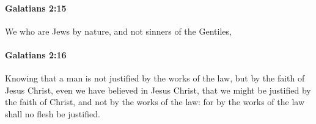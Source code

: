		\paragraph{Galatians 2:15} %
			\label{GALATIANS-2-15}

			We who are Jews by nature, and not sinners of the Gentiles,

			\begin{framed}
			\scriptsize
				\begin{compactdesc}
					\item[SBLG] 
				\end{compactdesc}
			\end{framed}

		\paragraph{Galatians 2:16} %
			\label{GALATIANS-2-16}

			Knowing that a man is not justified by the works of the law, but by the faith of Jesus Christ, even we have believed in Jesus Christ, that we might be justified by the faith of Christ, and not by the works of the law: for by the works of the law shall no flesh be justified.


